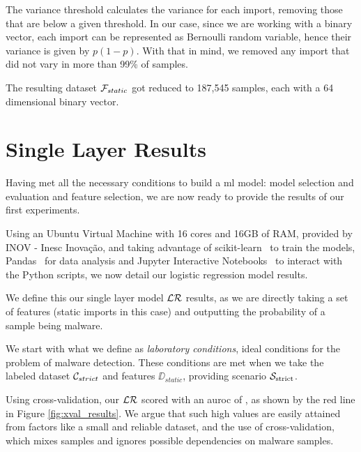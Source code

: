 The variance threshold calculates the variance for each import, removing those that are below a given threshold.
In our case, since we are working with a binary vector, each import can be represented as Bernoulli random variable, hence their variance is given by $p(1-p)$.
With that in mind, we removed any import that did not vary in more than 99\% of samples.

The resulting dataset $\mathcal{F}_{static}$ got reduced to 187,545 samples, each with a 64 dimensional binary vector.

\section{Single Layer Results}
\label{section:single_layer_results}

Having met all the necessary conditions to build a \gls{ml} model: model selection and evaluation and feature selection, we are now ready to provide the results of our first experiments.

Using an Ubuntu Virtual Machine with 16 cores and 16GB of RAM, provided by INOV - Inesc Inovação, and taking advantage of scikit-learn~\cite{tool:sklearn} to train the models, Pandas~\cite{tool:pandas} for data analysis and Jupyter Interactive Notebooks~\cite{tool:jupyter} to interact with the Python scripts, we now detail our logistic regression model results.

We define this our single layer model $\mathcal{LR}$ results, as we are directly taking a set of features (static imports in this case) and outputting the probability of a sample being malware.

\medskip

We start with what we define as \textit{laboratory conditions}, ideal conditions for the problem of malware detection.
These conditions are met when we take the labeled dataset $\mathcal{C}_{strict}$ and features $\DD_{static}$, providing scenario $\mathcal{S}_{\mathrm{strict}}$.

Using cross-validation, our $\mathcal{LR}$ scored with an \gls{auroc} of , as shown by the red line in Figure \ref{fig:xval_results}.
We argue that such high values are easily attained from factors like a small and reliable dataset, and the use of cross-validation, which mixes samples and ignores possible dependencies on malware samples.

